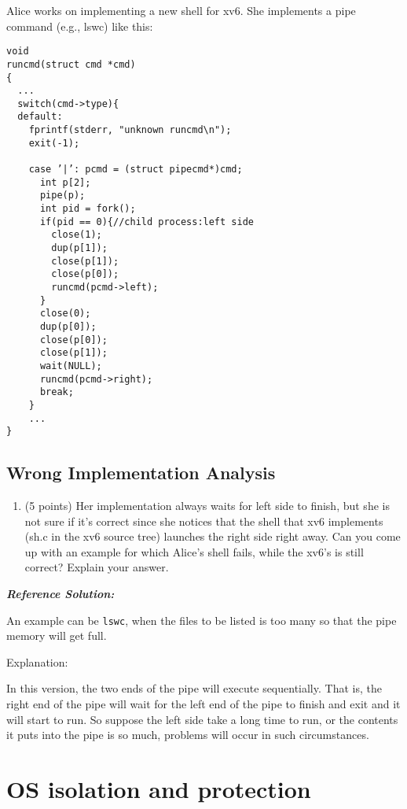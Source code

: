 \documentclass[]{article}
\providecommand{\tightlist}{%
  \setlength{\itemsep}{0pt}\setlength{\parskip}{0pt}}
\begin{document}
Alice works on implementing a new shell for xv6. She implements a pipe
command (e.g., ls\textbar{}wc) like this:

\begin{verbatim}
void
runcmd(struct cmd *cmd)
{
  ...
  switch(cmd->type){
  default:
    fprintf(stderr, "unknown runcmd\n");
    exit(-1);
    
    case ’|’: pcmd = (struct pipecmd*)cmd;
      int p[2];
      pipe(p);
      int pid = fork();
      if(pid == 0){//child process:left side
        close(1);
        dup(p[1]);
        close(p[1]);
        close(p[0]);
        runcmd(pcmd->left);
      }
      close(0);
      dup(p[0]);
      close(p[0]);
      close(p[1]);
      wait(NULL);
      runcmd(pcmd->right);
      break;
    }
    ...
}
\end{verbatim}

\hypertarget{wrong-implementation-analysis}{%
\subsection{Wrong Implementation
Analysis}\label{wrong-implementation-analysis}}

\begin{enumerate}
\def\labelenumi{(\alph{enumi})}
\tightlist
\item
  (5 points) Her implementation always waits for left side to finish,
  but she is not sure if it's correct since she notices that the shell
  that xv6 implements (sh.c in the xv6 source tree) launches the right
  side right away. Can you come up with an example for which Alice's
  shell fails, while the xv6's is still correct? Explain your answer.
\end{enumerate}

\textbf{\emph{Reference Solution:}}

An example can be \texttt{ls\textbar{}wc}, when the files to be listed
is too many so that the pipe memory will get full.

Explanation:

In this version, the two ends of the pipe will execute sequentially.
That is, the right end of the pipe will wait for the left end of the
pipe to finish and exit and it will start to run. So suppose the left
side take a long time to run, or the contents it puts into the pipe is
so much, problems will occur in such circumstances.

\hypertarget{os-isolation-and-protection}{%
\section{OS isolation and
protection}\label{os-isolation-and-protection}}
\end{document}
